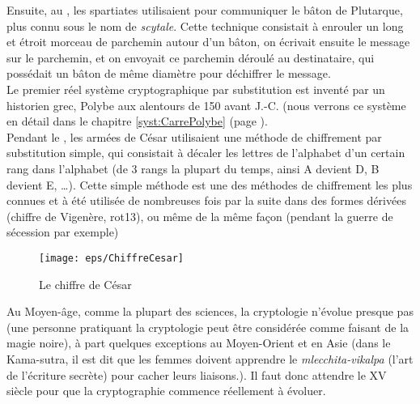 Ensuite, au , les spartiates utilisaient pour communiquer le
bâton de Plutarque, plus connu sous le nom de \emph{scytale}. Cette
technique consistait à enrouler un long et étroit morceau de parchemin
autour d'un bâton, on écrivait ensuite le message sur le parchemin, et
on envoyait ce parchemin déroulé au destinataire, qui possédait un
bâton
de même diamètre pour déchiffrer le message. \\

Le premier réel système cryptographique par substitution est inventé
par un historien grec, Polybe aux alentours de 150 avant J.-C. (nous
verrons ce système en détail dans le chapitre \ref{syst:CarrePolybe} (page
\pageref{syst:CarreColybe}). \\

\label{syst:ChiffreCesar}
Pendant le , les armées de César utilisaient une méthode de
chiffrement par substitution simple, qui consistait à décaler les
lettres de l'alphabet d'un certain rang dans l'alphabet (de 3 rangs la
plupart du temps, ainsi A devient D, B devient E, \dots). Cette simple
méthode est une des méthodes de chiffrement les plus connues et à été
utilisée de nombreuses fois par la suite dans des formes dérivées (chiffre de
Vigenère, rot13), ou même
de la même façon (pendant la guerre de sécession par exemple)

\begin{figure}[h]
  \begin{center}
    \texttt{[image: eps/ChiffreCesar]}
  \end{center}
  \caption{Le chiffre de César}
  \label{fig:chiffrecesar}
\end{figure}

Au Moyen-âge, comme la plupart des sciences, la cryptologie n'évolue
presque pas (une personne pratiquant la cryptologie peut être
considérée comme faisant de la magie noire), à part quelques exceptions
au Moyen-Orient et en Asie (dans le Kama-sutra, il est dit que les
femmes doivent apprendre le \emph{mlecchita-vikalpa} (l'art de
l'écriture secrète) pour cacher leurs liaisons.). Il faut donc
attendre le XV\ieme~ siècle pour que la cryptographie commence
réellement à évoluer. \\

